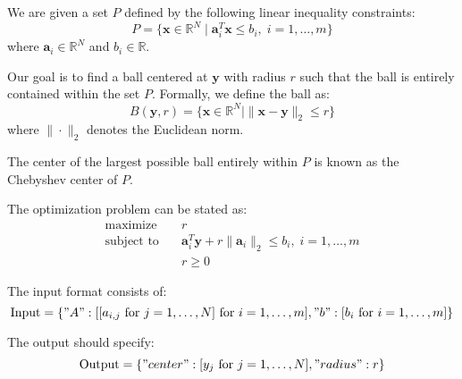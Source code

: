 \documentclass{article}
\begin{document}
We are given a set \( P \) defined by the following linear inequality constraints:
\[
P = \{ \mathbf{x} \in \mathbb{R}^N \mid \mathbf{a}_i^T \mathbf{x} \leq b_i, \; i = 1, \ldots, m \}
\]
where \( \mathbf{a}_i \in \mathbb{R}^N \) and \( b_i \in \mathbb{R} \).

Our goal is to find a ball centered at \( \mathbf{y} \) with radius \( r \) such that the ball is entirely contained within the set \( P \). Formally, we define the ball as:
\[
B(\mathbf{y}, r) = \{ \mathbf{x} \in \mathbb{R}^N \mid \|\mathbf{x} - \mathbf{y}\|_2 \leq r \}
\]
where \( \|\cdot\|_2 \) denotes the Euclidean norm.

The center of the largest possible ball entirely within \( P \) is known as the Chebyshev center of \( P \).

The optimization problem can be stated as:
\[
\begin{align*}
\text{maximize} \quad & r \\
\text{subject to} \quad & \mathbf{a}_i^T \mathbf{y} + r \|\mathbf{a}_i\|_2 \leq b_i, \; i = 1, \ldots, m \\
& r \geq 0
\end{align*}
\]

The input format consists of:
\[
\text{Input} = \{
    "A": [[a_{i,j} \text{ for } j=1, \ldots, N] \text{ for } i=1, \ldots, m],
    "b": [b_i \text{ for } i=1, \ldots, m]
\}
\]

The output should specify:
\[
\text{Output} = \{
    "center": [y_j \text{ for } j=1, \ldots, N],
    "radius": r
\}
\]
\end{document}

